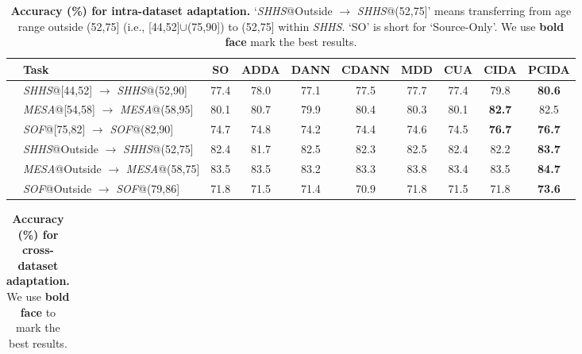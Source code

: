 \documentclass{article}
\begin{document}
\begin{table*}[t]
\begin{footnotesize}
\vskip -0.3cm
\begin{center}
\caption{ \textbf{Accuracy (\%) for intra-dataset adaptation.} `\emph{SHHS}@Outside $\rightarrow$ \emph{SHHS}@(52,75]' means transferring from age range outside (52,75] (i.e., [44,52]$\cup$(75,90]) to (52,75] within \emph{SHHS}. `SO' is short for `Source-Only'. 
We use \textbf{bold face} mark the best results.
} 
\label{tab:intra}
\vspace{1mm}
\begin{tabular}{clcccccccc}
\hline
& Task  & SO  & ADDA & DANN & CDANN & MDD & CUA & CIDA & PCIDA \\
\hline
{} & \emph{SHHS}@[44,52] $\rightarrow$ \emph{SHHS}@(52,90] & 77.4 & 78.0 & 77.1 & 77.5 & 77.7 & 77.4 & 79.8 & \textbf{80.6}  \\
 & \emph{MESA}@[54,58] $\rightarrow$ \emph{MESA}@(58,95]   & 80.1 & 80.7 & 79.9 & 80.4 & 80.3 & 80.1 & \textbf{82.7} & 82.5 \\
 & \emph{SOF}@[75,82] $\rightarrow$ \emph{SOF}@(82,90]   & 74.7 & 74.8 & 74.2 & 74.4 & 74.6 & 74.5 & \textbf{76.7} & \textbf{76.7} \\
\hline
{} & \emph{SHHS}@Outside $\rightarrow$ \emph{SHHS}@(52,75] & 82.4 & 81.7 & 82.5 & 82.3 & 82.5 & 82.4 & 82.2 & \textbf{83.7}  \\
& \emph{MESA}@Outside $\rightarrow$ \emph{MESA}@(58,75]   & 83.5 & 83.5 & 83.2 & 83.3 & 83.8 & 83.4 & 83.5 & \textbf{84.7} \\
& \emph{SOF}@Outside $\rightarrow$ \emph{SOF}@(79,86]   & 71.8 & 71.5 & 71.4 & 70.9 & 71.8 & 71.5 & 71.8 & \textbf{73.6}  \\
 \hline
\end{tabular}
\end{center}
\vskip -0.7cm
\end{footnotesize}
\end{table*} \begin{table*}[t]
\begin{footnotesize}
\begin{center}
\caption{ \textbf{Accuracy (\%) for cross-dataset adaptation.} We use \textbf{bold face} to mark the best results.}
\label{tab:cross}
\vspace{1mm}
\begin{tabular}{lcccccccc}

\end{tabular}
\end{center}
\end{footnotesize}
\end{table*}
\end{document}
